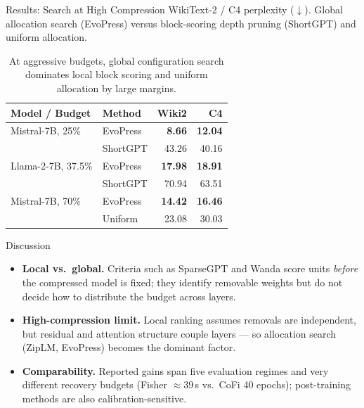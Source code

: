 \documentclass[final]{beamer}
\newlength{\onecolwid}
\begin{document}
\begin{frame}[t]
\begin{columns}[t]
\begin{column}{\onecolwid}
\begin{block}{Results: Search at High Compression}
WikiText-2 / C4 perplexity ($\downarrow$). Global allocation search (EvoPress)
versus block-scoring depth pruning (ShortGPT) and uniform allocation.
\begin{table}
\centering
\renewcommand{\arraystretch}{1.25}\small
\begin{tabular}{llrr}
\toprule
\textbf{Model / Budget} & \textbf{Method} & \textbf{Wiki2} & \textbf{C4} \\
\midrule
Mistral-7B, 25\%   & EvoPress & \textbf{8.66}  & \textbf{12.04} \\
                   & ShortGPT & 43.26 & 40.16 \\
Llama-2-7B, 37.5\% & EvoPress & \textbf{17.98} & \textbf{18.91} \\
                   & ShortGPT & 70.94 & 63.51 \\
Mistral-7B, 70\%   & EvoPress & \textbf{14.42} & \textbf{16.46} \\
                   & Uniform  & 23.08 & 30.03 \\
\bottomrule
\end{tabular}
\caption{At aggressive budgets, global configuration search dominates local
block scoring and uniform allocation by large margins.}
\end{table}
\end{block}

\begin{block}{Discussion}
\begin{itemize}
\item \textbf{Local vs.\ global.} Criteria such as SparseGPT and Wanda score
units \emph{before} the compressed model is fixed; they identify removable
weights but do not decide how to distribute the budget across layers.
\item \textbf{High-compression limit.} Local ranking assumes removals are
independent, but residual and attention structure couple layers --- so
allocation search (ZipLM, EvoPress) becomes the dominant factor.
\item \textbf{Comparability.} Reported gains span five evaluation regimes and
very different recovery budgets (Fisher $\approx$39\,s vs.\ CoFi 40 epochs);
post-training methods are also calibration-sensitive.
\end{itemize}
\end{block}


\end{column}
\end{columns}
\end{frame}
\end{document}
